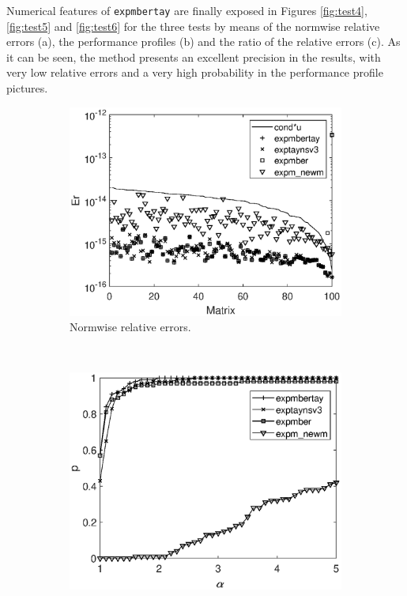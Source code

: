 \documentclass[preprint,10pt,numbers,sort&compress]{elsarticle}
\begin{document}
Numerical features of \texttt{expmbertay} are finally exposed in Figures \ref{fig:test4}, \ref{fig:test5} and \ref{fig:test6} for the three tests by means of the normwise relative errors (a), the performance profiles (b) and the ratio of the relative errors (c). As it can be seen, the method presents an excellent precision in the results, with very low relative errors and a very high probability in the performance profile pictures.
\begin{figure}[t]
\centering
\begin{subfigure}[b]{0.48\textwidth}
\includegraphics[scale=0.44]{normwise_exp_diag_hadamard_complex_n128_nd256_expmbertay.eps}
\caption{\footnotesize Normwise relative errors.} \label{fig:test4_a} \vspace{12pt}
\end{subfigure} \ \
\begin{subfigure}[b]{0.48\textwidth}
\includegraphics[scale=0.44]{nprofile_exp_diag_hadamard_complex_n128_nd256_expmbertay.eps}

\end{subfigure}
\end{figure}
\end{document}
